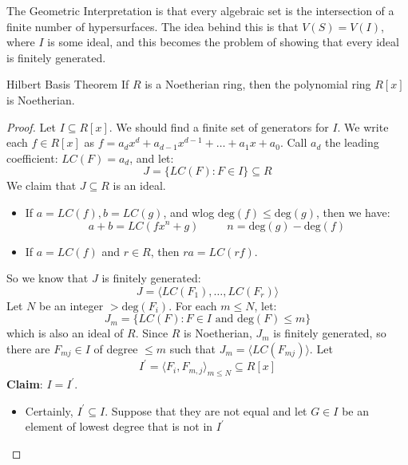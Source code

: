 \documentclass{report}
\begin{document}
The Geometric Interpretation is that every algebraic set is the intersection of a finite number of hypersurfaces. The idea behind this is that $V(S) = V(I)$, where $I$ is some ideal, and this becomes the problem of showing that every ideal is finitely generated.

\begin{theorem}{Hilbert Basis Theorem}
    If $R$ is a  Noetherian ring, then the polynomial ring $R[x]$ is Noetherian.
\end{theorem}
    \begin{proof}
        Let $I \subseteq R[x]$. We should find a finite set of generators for $I$. We write each $f \in R[x]$ as $f = a_{d}x^{d} + a_{d - 1}x^{d - 1} + \ldots + a_{1}x + a_{0}$. Call $a_{d}$ the leading coefficient: $LC(F) = a_{d}$, and let:
            \begin{equation*}
                J = \{LC(F): F \in I\} \subseteq R
            \end{equation*}
        We claim that $J \subseteq R$ is an ideal. 
            \begin{itemize}
                \item If $a = LC(f), b = LC(g)$, and wlog $\text{deg}(f) \leq \text{deg}(g)$, then we have:
                    \begin{equation*}
                        a + b = LC(fx^{n} + g) \hspace{30pt} n = \text{deg}(g) - \text{deg}(f)
                    \end{equation*}

                \item  If $a = LC(f)$ and $r \in R$, then $ra = LC(rf)$. 
            \end{itemize}
        So we know that $J$ is finitely generated:
            \begin{equation*}
                J = \langle LC(F_{1}), \ldots, LC(F_{r}) \rangle
            \end{equation*}
        Let $N$ be an integer $> \text{deg}(F_{i})$. For each $m \leq N$, let:
            \begin{equation*}
                J_{m} = \{LC(F): F \in I \text{ and deg}(F) \leq m\}
            \end{equation*}
        which is also an ideal of $R$. Since $R$ is Noetherian, $J_{m}$ is finitely generated, so there are $F_{mj} \in I$ of degree $\leq m$ such that $J_{m} = \langle LC(F_{mj}) \rangle$. Let
            \begin{equation*}
                I^{\prime} = \langle F_{i}, F_{m,j} \rangle_{m \leq N} \subseteq R[x]
            \end{equation*}
        \textbf{Claim}: $I = I^{\prime}$.
            \begin{itemize}
                \item Certainly, $I^{\prime} \subseteq I$. Suppose that they are not equal and let $G \in I$ be an element of lowest degree that is not in $I^{\prime}$


\end{itemize}
\end{proof}
\end{document}
